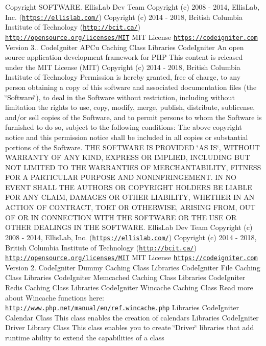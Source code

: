 \begin{DoxyCopyright}{Copyright}
S\+O\+F\+T\+W\+A\+RE.  Ellis\+Lab Dev Team  Copyright (c) 2008 -\/ 2014, Ellis\+Lab, Inc. (\href{https://ellislab.com/}{\tt https\+://ellislab.\+com/})  Copyright (c) 2014 -\/ 2018, British Columbia Institute of Technology (\href{http://bcit.ca/}{\tt http\+://bcit.\+ca/})  \href{http://opensource.org/licenses/MIT}{\tt http\+://opensource.\+org/licenses/\+M\+IT} M\+IT License  \href{https://codeigniter.com}{\tt https\+://codeigniter.\+com}  Version 3..  Code\+Igniter A\+P\+Cu Caching Class  Libraries Code\+Igniter An open source application development framework for P\+HP This content is released under the M\+IT License (M\+IT) Copyright (c) 2014 -\/ 2018, British Columbia Institute of Technology Permission is hereby granted, free of charge, to any person obtaining a copy of this software and associated documentation files (the \char`\"{}\+Software\char`\"{}), to deal in the Software without restriction, including without limitation the rights to use, copy, modify, merge, publish, distribute, sublicense, and/or sell copies of the Software, and to permit persons to whom the Software is furnished to do so, subject to the following conditions\+: The above copyright notice and this permission notice shall be included in all copies or substantial portions of the Software. T\+HE S\+O\+F\+T\+W\+A\+RE IS P\+R\+O\+V\+I\+D\+ED \char`\"{}\+A\+S I\+S\char`\"{}, W\+I\+T\+H\+O\+UT W\+A\+R\+R\+A\+N\+TY OF A\+NY K\+I\+ND, E\+X\+P\+R\+E\+SS OR I\+M\+P\+L\+I\+ED, I\+N\+C\+L\+U\+D\+I\+NG B\+UT N\+OT L\+I\+M\+I\+T\+ED TO T\+HE W\+A\+R\+R\+A\+N\+T\+I\+ES OF M\+E\+R\+C\+H\+A\+N\+T\+A\+B\+I\+L\+I\+TY, F\+I\+T\+N\+E\+SS F\+OR A P\+A\+R\+T\+I\+C\+U\+L\+AR P\+U\+R\+P\+O\+SE A\+ND N\+O\+N\+I\+N\+F\+R\+I\+N\+G\+E\+M\+E\+NT. IN NO E\+V\+E\+NT S\+H\+A\+LL T\+HE A\+U\+T\+H\+O\+RS OR C\+O\+P\+Y\+R\+I\+G\+HT H\+O\+L\+D\+E\+RS BE L\+I\+A\+B\+LE F\+OR A\+NY C\+L\+A\+IM, D\+A\+M\+A\+G\+ES OR O\+T\+H\+ER L\+I\+A\+B\+I\+L\+I\+TY, W\+H\+E\+T\+H\+ER IN AN A\+C\+T\+I\+ON OF C\+O\+N\+T\+R\+A\+CT, T\+O\+RT OR O\+T\+H\+E\+R\+W\+I\+SE, A\+R\+I\+S\+I\+NG F\+R\+OM, O\+UT OF OR IN C\+O\+N\+N\+E\+C\+T\+I\+ON W\+I\+TH T\+HE S\+O\+F\+T\+W\+A\+RE OR T\+HE U\+SE OR O\+T\+H\+ER D\+E\+A\+L\+I\+N\+GS IN T\+HE S\+O\+F\+T\+W\+A\+RE.  Ellis\+Lab Dev Team  Copyright (c) 2008 -\/ 2014, Ellis\+Lab, Inc. (\href{https://ellislab.com/}{\tt https\+://ellislab.\+com/})  Copyright (c) 2014 -\/ 2018, British Columbia Institute of Technology (\href{http://bcit.ca/}{\tt http\+://bcit.\+ca/})  \href{http://opensource.org/licenses/MIT}{\tt http\+://opensource.\+org/licenses/\+M\+IT} M\+IT License  \href{https://codeigniter.com}{\tt https\+://codeigniter.\+com}  Version 2.  Code\+Igniter Dummy Caching Class  Libraries Code\+Igniter File Caching Class  Libraries Code\+Igniter Memcached Caching Class  Libraries Code\+Igniter Redis Caching Class  Libraries Code\+Igniter Wincache Caching Class Read more about Wincache functions here\+: \href{http://www.php.net/manual/en/ref.wincache.php}{\tt http\+://www.\+php.\+net/manual/en/ref.\+wincache.\+php}  Libraries Code\+Igniter Calendar Class This class enables the creation of calendars  Libraries Code\+Igniter Driver Library Class This class enables you to create \char`\"{}\+Driver\char`\"{} libraries that add runtime ability to extend the capabilities of a class 
\end{DoxyCopyright}
